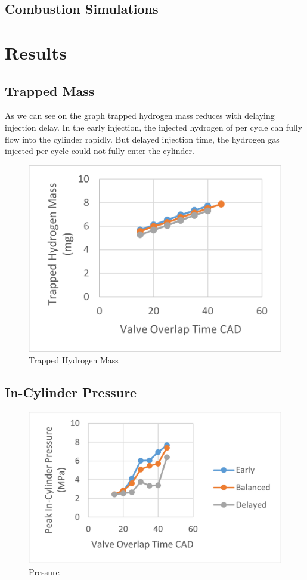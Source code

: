 \documentclass[conference]{IEEEtran}
\begin{document}
\subsection{Combustion Simulations}

\section{Results}
\subsection{Trapped Mass}
As we can see on the graph trapped hydrogen mass reduces with delaying injection delay. In the early injection, the injected hydrogen of per cycle can fully flow into the cylinder rapidly. But delayed injection time, the hydrogen gas injected per cycle could not fully enter the cylinder. 

\begin{figure}[htbp]
    \centerline{\includegraphics{Plots/trapped mass.png}}
    \caption{Trapped Hydrogen Mass}
    \label{plt_1}
    \end{figure}

\subsection{In-Cylinder Pressure}
\begin{figure}[htbp]
    \centerline{\includegraphics{Plots/pressure.png}}
    \caption{Pressure}
    \label{plt_2}
    \end{figure}
\end{document}

